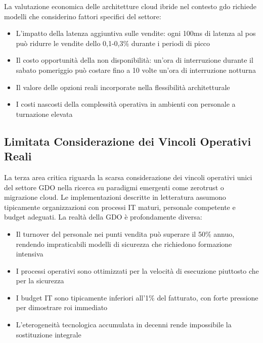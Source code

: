 La valutazione economica delle architetture cloud ibride nel contesto \gls{gdo} richiede modelli che considerino fattori specifici del settore:
\begin{itemize}
\item L'impatto della latenza aggiuntiva sulle vendite: ogni 100ms di latenza al \gls{pos} può ridurre le vendite dello 0,1-0,3\% durante i periodi di picco
\item Il costo opportunità della non disponibilità: un'ora di interruzione durante il sabato pomeriggio può costare fino a 10 volte un'ora di interruzione notturna
\item Il valore delle opzioni reali incorporate nella flessibilità architetturale
\item I costi nascosti della complessità operativa in ambienti con personale a turnazione elevata
\end{itemize}

\subsection{\texorpdfstring{\textbf{Limitata Considerazione dei Vincoli Operativi Reali}}{1.2.3 - Limitata Considerazione dei Vincoli Operativi Reali}}
\label{subsec:vincoli_operativi}

La terza area critica riguarda la scarsa considerazione dei vincoli operativi unici del settore GDO nella ricerca su paradigmi emergenti come \gls{zerotrust} o migrazione cloud. Le implementazioni descritte in letteratura assumono tipicamente organizzazioni con processi IT maturi, personale competente e budget adeguati. La realtà della GDO è profondamente diversa:

\begin{itemize}
\item Il turnover del personale nei punti vendita può superare il 50\% annuo, rendendo impraticabili modelli di sicurezza che richiedono formazione intensiva
\item I processi operativi sono ottimizzati per la velocità di esecuzione piuttosto che per la sicurezza
\item I budget IT sono tipicamente inferiori all'1\% del fatturato, con forte pressione per dimostrare \gls{roi} immediato
\item L'eterogeneità tecnologica accumulata in decenni rende impossibile la sostituzione integrale
\end{itemize}


